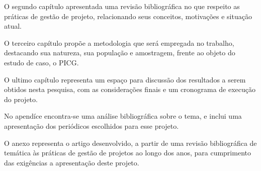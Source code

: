 O segundo capítulo apresentada uma revisão bibliográfica no que respeito as práticas de gestão de projeto, relacionando seus conceitos, motivações e situação atual.

O terceiro capítulo propõe a metodologia que será empregada no trabalho, destacando sua natureza, sua população e amostragem, frente ao objeto do estudo de caso, o PICG.

O ultimo capítulo representa um espaço para discussão dos resultados a serem obtidos nesta pesquisa, com as considerações finais e um cronograma de execução do projeto.

No apendíce encontra-se uma análise bibliográfica sobre o tema, e inclui uma apresentação dos periódicos escolhidos para esse projeto.

O anexo representa o artigo desenvolvido, a partir de uma revisão bibliográfica de temática às práticas de gestão de projetos ao longo dos anos, para cumprimento das exigências a apresentação deste projeto.
